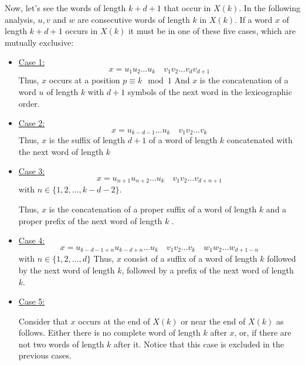 \documentclass[11pt,a4paper]{tesis}
\begin{document}
Now, let's see  the words of length $k + d + 1$ that occur in $X(k)$. %
In the following analysis, $u, v$ and $w$ are consecutive words of length $k$ in $X(k)$.
If a  word $x$  of length $k + d + 1$  occurs in $X(k)$ it must be in one of these five cases, which are mutually exclusive:

\begin{itemize}
  \item \underline{Case 1:} 
  $$x = u_1 u_2 \dots u_k \quad v_1 v_2 \dots v_{d} v_{d + 1}$$
    Thus, $x$ occurs at a position $p\equiv k \mod 1$ 
    And $x$ is the concatenation of a word $u$ of length $k$ with $d+1$ symbols of the next word in the lexicographic order.

  \item \underline{Case 2:} 
  $$ x = u_{k-d-1} \dots u_k \quad v_1 v_2 \dots v_k$$
  Thus, $x$ is  the suffix of length $d + 1$ of a word of length $k$  concatenated with  the next word of length $k$

  \item \underline{Case 3:} 
  $$x = u_{n+1} u_{n+2} \dots u_k \quad  v_1 v_2 \dots v_{d+n+1} $$
with $n \in \{1,2,\dots ,k - d - 2\}$.

Thus, $x$ is the concatenation of a proper suffix of a word of length $k$ and a proper prefix of the next word of length $k$ .

  
  \item \underline{Case 4:} 
  $$ x = u_{k-d-1+n} u_{k-d+n} \dots u_k \quad v_1 v_2 \dots v_k \quad w_1 w_2 \dots w_{d+1-n}$$
  with $n \in \{1, 2, \dots , d\}$
Thus, $x$ consist of a suffix of a word of length $k$ followed by the next  word of length $k$,
 followed by a prefix of  the next  word of length $k$.

  \item \underline{Case 5:} 
  
Consider that    $x$ occurs at the end of $X(k)$ or near the end of   $X(k)$ as follows. Either there is no complete word of length $k$ after $x$, 
or, if there are not two words of length $k$ after it. Notice that this case is excluded in  the previous cases.

  \end{itemize}
\end{document}
